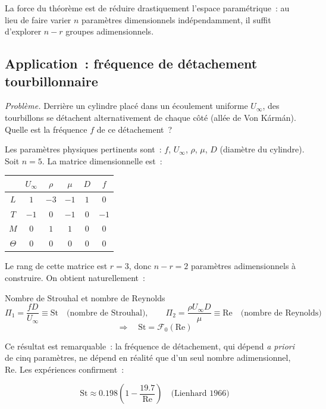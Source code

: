 \documentclass[11pt,a4paper]{report}
\begin{document}
La force du théorème est de réduire drastiquement l'espace paramétrique~:
au lieu de faire varier $n$ paramètres dimensionnels indépendamment,
il suffit d'explorer $n-r$ groupes adimensionnels.

\subsection{Application~: fréquence de détachement tourbillonnaire}

\textit{Problème.} Derrière un cylindre placé dans un écoulement uniforme
$U_\infty$, des tourbillons se détachent alternativement de chaque côté
(allée de Von Kármán). Quelle est la fréquence $f$ de ce détachement~?

Les paramètres physiques pertinents sont~: $f$, $U_\infty$, $\rho$, $\mu$, $D$
(diamètre du cylindre). Soit $n=5$. La matrice dimensionnelle est~:

\begin{center}
\renewcommand{\arraystretch}{1.2}
\begin{tabular}{c|ccccc}
 & $U_\infty$ & $\rho$ & $\mu$ & $D$ & $f$ \\
\hline
$L$ & $1$ & $-3$ & $-1$ & $1$ & $0$ \\
$T$ & $-1$ & $0$ & $-1$ & $0$ & $-1$ \\
$M$ & $0$ & $1$ & $1$ & $0$ & $0$ \\
$\Theta$ & $0$ & $0$ & $0$ & $0$ & $0$ \\
\end{tabular}
\end{center}

Le rang de cette matrice est $r=3$, donc $n-r=2$ paramètres adimensionnels
à construire. On obtient naturellement~:

\begin{importantbox}{Nombre de Strouhal et nombre de Reynolds}
\[
\Pi_1 = \frac{fD}{U_\infty} \equiv \mathrm{St} \quad \text{(nombre de Strouhal)},
\qquad
\Pi_2 = \frac{\rho U_\infty D}{\mu} \equiv \mathrm{Re} \quad \text{(nombre de Reynolds)}
\]
\[
\Longrightarrow \quad \mathrm{St} = \mathcal{F}_0(\mathrm{Re})
\]
\end{importantbox}

Ce résultat est remarquable~: la fréquence de détachement, qui dépend
\textit{a priori} de cinq paramètres, ne dépend en réalité que d'un seul
nombre adimensionnel, Re. Les expériences confirment~:

\[
\mathrm{St} \approx 0.198\left(1 - \frac{19.7}{\mathrm{Re}}\right)
\quad \text{(Lienhard 1966)}
\]
\end{document}
